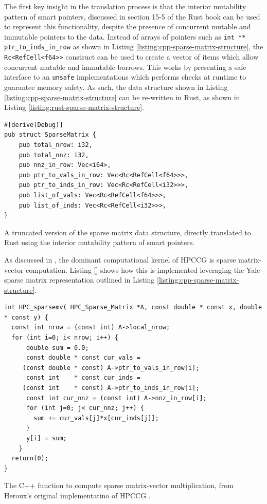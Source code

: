 The first key insight in the translation process is that the interior mutability pattern of smart pointers, discussed in section 15-5 of the Rust book \cite{RustProgrammingLanguage} can be used to represent this functionality, despite the presence of concurrent mutable and immutable pointers to the data. Instead of arrays of pointers such as \texttt{int ** ptr_to_inds_in_row} as shown in Listing \ref{listing:cpp-sparse-matrix-structure}, the \texttt{Rc<RefCell<f64>>} construct can be used to create a vector of items which allow concurrent mutable and immutable borrows. This works by presenting a safe interface to an \texttt{unsafe} implementations which performs checks at runtime to guarantee memory safety. As such, the data structure shown in Listing \ref{listing:cpp-sparse-matrix-structure} can be re-written in Rust, as shown in Listing \ref{listing:rust-sparse-matrix-structure}.

\begin{listing}[H]
    \begin{verbatim}
#[derive(Debug)]
pub struct SparseMatrix {
    pub total_nrow: i32,
    pub total_nnz: i32,
    pub nnz_in_row: Vec<i64>,
    pub ptr_to_vals_in_row: Vec<Rc<RefCell<f64>>>,
    pub ptr_to_inds_in_row: Vec<Rc<RefCell<i32>>>,
    pub list_of_vals: Vec<Rc<RefCell<f64>>>,
    pub list_of_inds: Vec<Rc<RefCell<i32>>>,
}
    \end{verbatim}
    \caption{A truncated version of the sparse matrix data structure, directly translated to Rust using the interior mutability pattern of smart pointers.}
    \label{listing:rust-sparse-matrix-structure}
\end{listing}

As discussed in , the dominant computational kernel of HPCCG is sparse matrix-vector computation. Listing \ref{} shows how this is implemented leveraging the Yale sparse matrix representation outlined in Listing \ref{listing:cpp-sparse-matrix-structure}.

\begin{listing}[H]
    \begin{verbatim}
int HPC_sparsemv( HPC_Sparse_Matrix *A, const double * const x, double * const y) {
  const int nrow = (const int) A->local_nrow;
  for (int i=0; i< nrow; i++) {
      double sum = 0.0;
      const double * const cur_vals = 
     (const double * const) A->ptr_to_vals_in_row[i];
      const int    * const cur_inds = 
     (const int    * const) A->ptr_to_inds_in_row[i];
      const int cur_nnz = (const int) A->nnz_in_row[i];
      for (int j=0; j< cur_nnz; j++) {
        sum += cur_vals[j]*x[cur_inds[j]];
      }
      y[i] = sum;
    }
  return(0);
}
    \end{verbatim}
    \caption{The C++ function to compute sparse matrix-vector multiplication, from Heroux's original implementatino of HPCCG \cite{MantevoHPCCG2023}.}
    \label{listing:cpp-sparsemv}
\end{listing}

